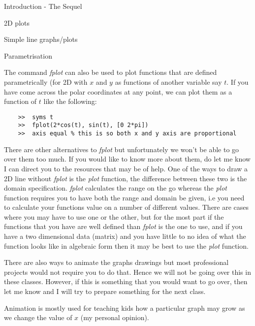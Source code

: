 \documentclass[11pt, oneside]{report}   	%
\begin{document}
\begin{chapter}{Introduction - The Sequel}
\begin{section}{2D plots}
\begin{subsection}{Simple line graphs/plots}
\end{subsection}

\begin{subsection}{Parametrisation}

The command \textit{fplot} can also be used to plot functions that are defined parametrically (for 2D with $x$ and
$y$ as functions of another variable say $t$. If you have come across the polar coordinates at any point, we can
plot them as a function of $t$ like the following:

\begin{lstlisting}
	>>	syms t
	>>	fplot(2*cos(t), sin(t), [0 2*pi])
	>>	axis equal % this is so both x and y axis are proportional
\end{lstlisting}

There are other alternatives to \textit{fplot} but unfortunately we won't be able to go over them too much. If you
would like to know more about them, do let me know I can direct you to the resources that may be of help. One of
the ways to draw a 2D line without \textit{fplot} is the \textit{plot} function, the difference between these two is the
domain specification. \textit{fplot} calculates the range on the go whereas the \textit{plot} function requires you to
have both the range and domain be given, i.e you need to calculate your functions value on a number of different
values. There are cases where you may have to use one or the other, but for the most part if the functions that you
have are well defined than \textit{fplot} is the one to use, and if you have a two dimensional data (matrix) and you
have little to no idea of what the function looks like in algebraic form then it may be best to use the \textit{plot}
function. 

There are also ways to animate the graphs drawings but most professional projects would not require you to do
that. Hence we will not be going over this in these classes. However, if this is something that you would want to go
over, then let me know and I will try to prepare something for the next class. 

Animation is mostly used for teaching kids how a particular graph may grow as we change the value of $x$ (my
personal opinion).
\end{subsection}

\end{section}

\end{chapter}
\end{document}
